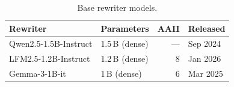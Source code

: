 \begin{table}[h]
  \centering\footnotesize
  \caption{Base rewriter models.}
  \label{tab:rewriters}
  \begin{tabular}{llrl}
    \toprule
    Rewriter & Parameters & AAII & Released \\
    \midrule
    Qwen2.5-1.5B-Instruct \citep{qwenQwen2515BInstructCard}   & 1.5\,B (dense) & ---                          & Sep 2024 \\
    LFM2.5-1.2B-Instruct \citep{liquidaiLfm2512BInstructCard} & 1.2\,B (dense) & 8 \citep{aaLfm2512BInstruct} & Jan 2026 \\
    Gemma-3-1B-it \citep{googleGemma31BItCard}                & 1\,B (dense)   & 6 \citep{aaGemma31B}         & Mar 2025 \\
    \bottomrule
  \end{tabular}
\end{table}
